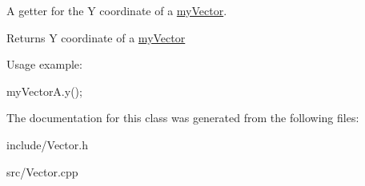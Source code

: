 A getter for the Y coordinate of a \hyperlink{classmy_vector}{my\+Vector}. 

\begin{DoxyReturn}{Returns}
Y coordinate of a \hyperlink{classmy_vector}{my\+Vector}
\end{DoxyReturn}
Usage example\+: 
\begin{DoxyCode}
myVectorA.y();
\end{DoxyCode}
 

The documentation for this class was generated from the following files\+:\begin{DoxyCompactItemize}
\item 
include/Vector.\+h\item 
src/Vector.\+cpp\end{DoxyCompactItemize}
